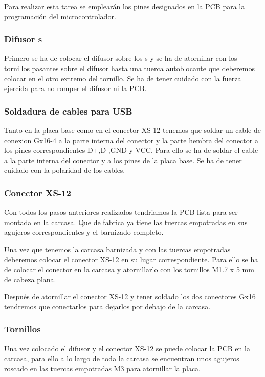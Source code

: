 Para realizar esta tarea se emplearán los pines designados en la \gls{PCB} para la programación del microcontrolador.

\subsubsection{Difusor s}
Primero se ha de colocar el difusor sobre los s y se ha de atornillar con los tornillos pasantes sobre el difusor hasta una tuerca autoblocante que deberemos colocar en el otro extremo del tornillo. Se ha de tener cuidado con la fuerza ejercida para no romper el difusor ni la \gls{PCB}.

\subsubsection{Soldadura de cables para \gls{USB}}
Tanto en la placa base como en el conector XS-12 tenemos que soldar un cable de conexion Gx16-4 a la parte interna del conector y la parte hembra del conector a los pines correspondientes D+,D-,GND y VCC. Para ello se ha de soldar el cable a la parte interna del conector y a los pines de la placa base. Se ha de tener cuidado con la polaridad de los cables.

\subsubsection{Conector XS-12}
Con todos los pasos anteriores realizados tendriamos la \gls{PCB} lista para ser montada en la carcasa. Que de fabrica ya tiene las tuercas empotradas en sus agujeros correspondientes y el barnizado completo.

Una vez que tenemos la carcasa barnizada y con las tuercas empotradas deberemos colocar el conector XS-12 en su lugar correspondiente. Para ello se ha de colocar el conector en la carcasa y atornillarlo con los tornillos M1.7 x 5 mm de cabeza plana.

Después de atornillar el conector XS-12 y tener soldado los dos conectores Gx16 tendremos que conectarlos para dejarlos por debajo de la carcasa.

\subsubsection{Tornillos} \label{Tornillos}
Una vez colocado el difusor y el conector XS-12 se puede colocar la \gls{PCB} en la carcasa, para ello a lo largo de toda la carcasa se encuentran unos agujeros roscado en las tuercas empotradas M3 para atornillar la placa.


